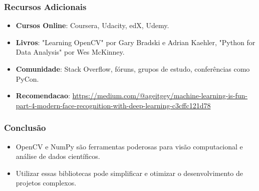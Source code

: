 \documentclass{beamer}
\begin{document}
\begin{frame}
    \frametitle{Recursos Adicionais}
    \begin{itemize}
        \item \textbf{Cursos Online}: Coursera, Udacity, edX, Udemy.
        \item \textbf{Livros}: "Learning OpenCV" por Gary Bradski e Adrian Kaehler, "Python for Data Analysis" por Wes McKinney.
        \item \textbf{Comunidade}: Stack Overflow, fóruns, grupos de estudo, conferências como PyCon.
        \item \textbf{Recomendacao}: \url{https://medium.com/@ageitgey/machine-learning-is-fun-part-4-modern-face-recognition-with-deep-learning-c3cffc121d78}
    \end{itemize}
\end{frame}

\begin{frame}
    \frametitle{Conclusão}
    \begin{itemize}
        \item OpenCV e NumPy são ferramentas poderosas para visão computacional e análise de dados científicos.
        \item Utilizar essas bibliotecas pode simplificar e otimizar o desenvolvimento de projetos complexos.
    \end{itemize}
\end{frame}
\end{document}

